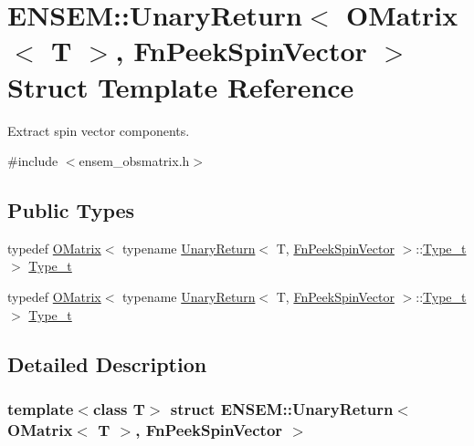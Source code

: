 \hypertarget{structENSEM_1_1UnaryReturn_3_01OMatrix_3_01T_01_4_00_01FnPeekSpinVector_01_4}{}\section{E\+N\+S\+EM\+:\+:Unary\+Return$<$ O\+Matrix$<$ T $>$, Fn\+Peek\+Spin\+Vector $>$ Struct Template Reference}
\label{structENSEM_1_1UnaryReturn_3_01OMatrix_3_01T_01_4_00_01FnPeekSpinVector_01_4}


Extract spin vector components.  




{\ttfamily \#include $<$ensem\+\_\+obsmatrix.\+h$>$}

\subsection*{Public Types}
\begin{DoxyCompactItemize}
\item 
typedef \mbox{\hyperlink{classENSEM_1_1OMatrix}{O\+Matrix}}$<$ typename \mbox{\hyperlink{structENSEM_1_1UnaryReturn}{Unary\+Return}}$<$ T, \mbox{\hyperlink{structENSEM_1_1FnPeekSpinVector}{Fn\+Peek\+Spin\+Vector}} $>$\+::\mbox{\hyperlink{structENSEM_1_1UnaryReturn_3_01OMatrix_3_01T_01_4_00_01FnPeekSpinVector_01_4_a995bd2c849af30377b0fa17937b63f19}{Type\+\_\+t}} $>$ \mbox{\hyperlink{structENSEM_1_1UnaryReturn_3_01OMatrix_3_01T_01_4_00_01FnPeekSpinVector_01_4_a995bd2c849af30377b0fa17937b63f19}{Type\+\_\+t}}
\item 
typedef \mbox{\hyperlink{classENSEM_1_1OMatrix}{O\+Matrix}}$<$ typename \mbox{\hyperlink{structENSEM_1_1UnaryReturn}{Unary\+Return}}$<$ T, \mbox{\hyperlink{structENSEM_1_1FnPeekSpinVector}{Fn\+Peek\+Spin\+Vector}} $>$\+::\mbox{\hyperlink{structENSEM_1_1UnaryReturn_3_01OMatrix_3_01T_01_4_00_01FnPeekSpinVector_01_4_a995bd2c849af30377b0fa17937b63f19}{Type\+\_\+t}} $>$ \mbox{\hyperlink{structENSEM_1_1UnaryReturn_3_01OMatrix_3_01T_01_4_00_01FnPeekSpinVector_01_4_a995bd2c849af30377b0fa17937b63f19}{Type\+\_\+t}}
\end{DoxyCompactItemize}


\subsection{Detailed Description}
\subsubsection*{template$<$class T$>$\newline
struct E\+N\+S\+E\+M\+::\+Unary\+Return$<$ O\+Matrix$<$ T $>$, Fn\+Peek\+Spin\+Vector $>$}


